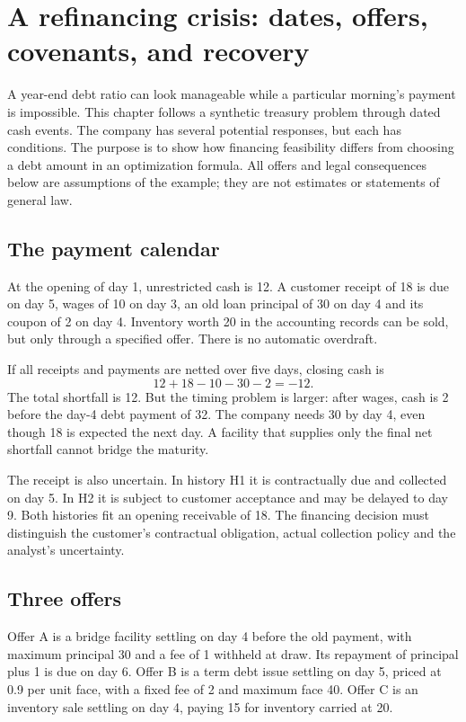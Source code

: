 \chapter[A refinancing crisis in dated events]{A refinancing crisis: dates, offers, covenants, and recovery}
\label{sim:refinancing-case}

A year-end debt ratio can look manageable while a particular morning's payment is impossible. This chapter follows a synthetic treasury problem through dated cash events. The company has several potential responses, but each has conditions. The purpose is to show how financing feasibility differs from choosing a debt amount in an optimization formula. All offers and legal consequences below are assumptions of the example; they are not estimates or statements of general law.

\section{The payment calendar}
At the opening of day 1, unrestricted cash is 12. A customer receipt of 18 is due on day 5, wages of 10 on day 3, an old loan principal of 30 on day 4 and its coupon of 2 on day 4. Inventory worth 20 in the accounting records can be sold, but only through a specified offer. There is no automatic overdraft.

If all receipts and payments are netted over five days, closing cash is
\begin{equation}
 12+18-10-30-2=-12.
\end{equation}
The total shortfall is 12. But the timing problem is larger: after wages, cash is 2 before the day-4 debt payment of 32. The company needs 30 by day 4, even though 18 is expected the next day. A facility that supplies only the final net shortfall cannot bridge the maturity.

The receipt is also uncertain. In history H1 it is contractually due and collected on day 5. In H2 it is subject to customer acceptance and may be delayed to day 9. Both histories fit an opening receivable of 18. The financing decision must distinguish the customer's contractual obligation, actual collection policy and the analyst's uncertainty.

\section{Three offers}
Offer A is a bridge facility settling on day 4 before the old payment, with maximum principal 30 and a fee of 1 withheld at draw. Its repayment of principal plus 1 is due on day 6. Offer B is a term debt issue settling on day 5, priced at 0.9 per unit face, with a fixed fee of 2 and maximum face 40. Offer C is an inventory sale settling on day 4, paying 15 for inventory carried at 20.

